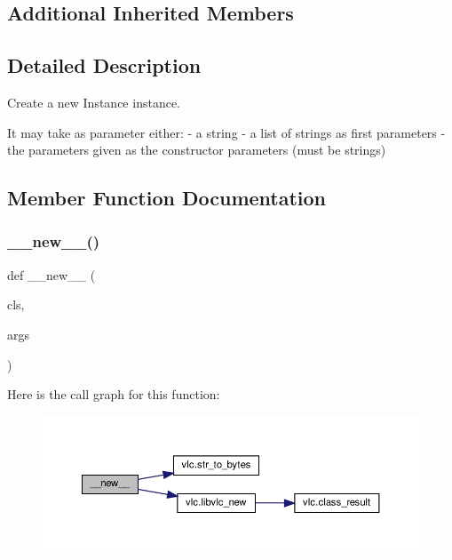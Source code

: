 \subsection*{Additional Inherited Members}


\subsection{Detailed Description}
\begin{DoxyVerb}Create a new Instance instance.

It may take as parameter either:
  - a string
  - a list of strings as first parameters
  - the parameters given as the constructor parameters (must be strings)\end{DoxyVerb}
 

\subsection{Member Function Documentation}
\mbox{\label{classvlc_1_1_instance_acc2aa3fac6a63e8bac4f19efc327102b}} 
\subsubsection{\texorpdfstring{\+\_\+\+\_\+new\+\_\+\+\_\+()}{\_\_new\_\_()}}
{\footnotesize\ttfamily def \+\_\+\+\_\+new\+\_\+\+\_\+ (\begin{DoxyParamCaption}\item[{}]{cls,  }\item[{}]{args }\end{DoxyParamCaption})}

Here is the call graph for this function\+:
\nopagebreak
\begin{figure}[H]
\begin{center}
\leavevmode
\includegraphics[width=350pt]{classvlc_1_1_instance_acc2aa3fac6a63e8bac4f19efc327102b_cgraph}
\end{center}
\end{figure}
\mbox{\label{classvlc_1_1_instance_a2f16d4ca3ce5f13e304911d652e8bf6c}} 
